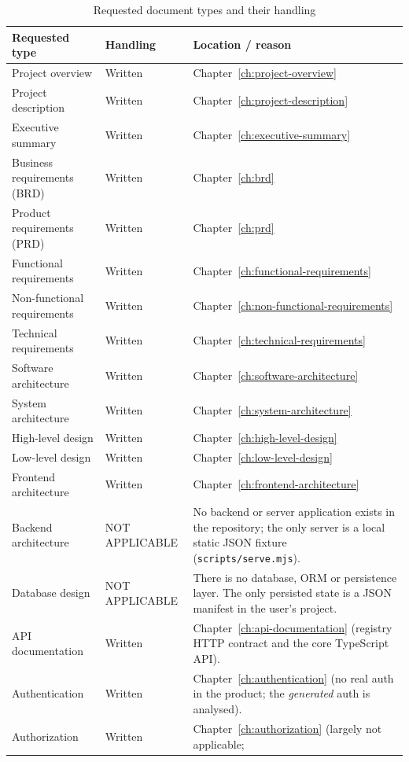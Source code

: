 \begin{longtable}{p{4.6cm}p{2.7cm}p{7.1cm}}
\caption{Requested document types and their handling}\\
\toprule
\textbf{Requested type} & \textbf{Handling} & \textbf{Location / reason} \\
\midrule

Project overview & Written & Chapter~\ref{ch:project-overview} \\
Project description & Written & Chapter~\ref{ch:project-description} \\
Executive summary & Written & Chapter~\ref{ch:executive-summary} \\
Business requirements (BRD) & Written & Chapter~\ref{ch:brd} \\
Product requirements (PRD) & Written & Chapter~\ref{ch:prd} \\
Functional requirements & Written & Chapter~\ref{ch:functional-requirements} \\
Non-functional requirements & Written & Chapter~\ref{ch:non-functional-requirements} \\
Technical requirements & Written & Chapter~\ref{ch:technical-requirements} \\
Software architecture & Written & Chapter~\ref{ch:software-architecture} \\
System architecture & Written & Chapter~\ref{ch:system-architecture} \\
High-level design & Written & Chapter~\ref{ch:high-level-design} \\
Low-level design & Written & Chapter~\ref{ch:low-level-design} \\
Frontend architecture & Written & Chapter~\ref{ch:frontend-architecture} \\
Backend architecture & NOT APPLICABLE & No backend or server application exists
in the repository; the only server is a local static JSON fixture
(\texttt{scripts/serve.mjs}). \\
Database design & NOT APPLICABLE & There is no database, ORM or persistence layer.
The only persisted state is a JSON manifest in the user's project. \\
API documentation & Written & Chapter~\ref{ch:api-documentation} (registry HTTP
contract and the core TypeScript API). \\
Authentication & Written & Chapter~\ref{ch:authentication} (no real auth in the
product; the \emph{generated} auth is analysed). \\
Authorization & Written & Chapter~\ref{ch:authorization} (largely not applicable;

\end{longtable}

